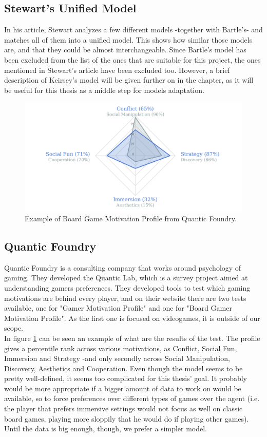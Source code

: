 \subsection{Stewart's Unified Model}
In his article, Stewart analyzes a few different models -together with Bartle's- and matches all of them into a unified model\cite{stewart2011personality}. This shows how similar those models are, and that they could be almost interchangeable.
Since Bartle's model has been excluded from the list of the ones that are suitable for this project, the ones mentioned in Stewart's article have been excluded too. However, a brief description of Keirsey's model will be given further on in the chapter, as it will be useful for this thesis as a middle step for models adaptation.
\begin{figure}[H]
    \centering 
    \includegraphics[scale=0.2]{figure/quanticfoundry.png}
    \caption{Example of Board Game Motivation Profile from Quantic Foundry\cite{chartprofile}.}
    \label{fig:quantic}
\end{figure}
\subsection{Quantic Foundry}
Quantic Foundry is a consulting company that works around psychology of gaming. They developed the Quantic Lab\cite{quanticfoundry}, which is a survey project aimed at understanding gamers preferences. They developed tools to test which gaming motivations are behind every player, and on their website there are two tests available, one for "Gamer Motivation Profile"\cite{yee2016gamer} and one for "Board Gamer Motivation Profile". As the first one is focused on videogames, it is outside of our scope.\\
In figure \ref{fig:quantic} can be seen an example of what are the results of the test. The profile gives a percentile rank across various motivations, as Conflict, Social Fun, Immersion and Strategy -and only secondly across Social Manipulation, Discovery, Aesthetics and Cooperation.
Even though the model seems to be pretty well-defined, it seems too complicated for this thesis' goal. It probably would be more appropriate if a bigger amount of data to work on would be available, so to force preferences over different types of games over the agent (i.e. the player that prefers immersive settings would not focus as well on classic board games, playing more sloppily that he would do if playing other games). Until the data is big enough, though, we prefer a simpler model.
